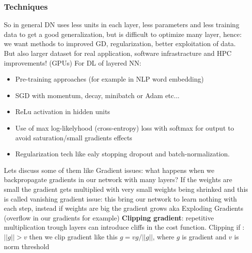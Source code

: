 \documentclass[12pt]{book}
\begin{document}
\subsubsection{Techniques}
So in general DN uses less units in each layer, less parameters and less training data to get a good generalization, but is difficult to optimize many layer, hence: we want methods to improved GD, regularization, better exploitation of data. But also larger dataset for real application, software infrastracture and HPC improvements! (GPUs)
\newline\newline
For DL of layered NN:
\begin{itemize}
	\item Pre-training approaches (for example in NLP word embedding)
	\item SGD with momentum, decay, minibatch or Adam etc...
	\item ReLu activation in hidden units
	\item Use of max log-likelyhood (cross-entropy) loss with softmax for output to avoid saturation/small gradients effects
	\item Regularization tech like ealy stopping dropout and batch-normalization.
\end{itemize}

Lets discuss some of them like Gradient issues: what happens when we backpropagate gradients in our network with many layers?
If the weights are small the gradient gets multiplied with very small weights being shrinked and this is called vanishing gradient issue: this bring our network to learn nothing with each step, instead if weights are big the gradient grows aka Exploding Gradients (overflow in our gradients for example)
\clearpage
\textbf{Clipping gradient}: repetitive multiplication trough layers can introduce cliffs in the cost function.\newline
Clipping if : $||g|| > v$ then we clip gradient like this $g = v g / ||g||$, where $g$ is gradient and $v$ is norm threshold
\end{document}
